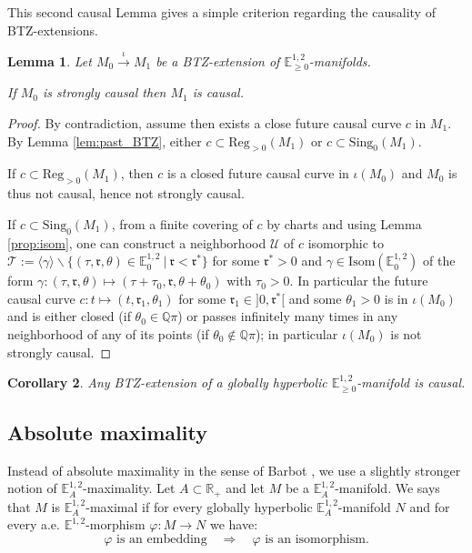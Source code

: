 \documentclass[a4paper,12pt]{article}
\def\r{\mathfrak{r}}
\def\U{\mathcal U}
\def\isom{Isom}
\def\sing{\mathrm{Sing}}
\def\RR{\mathbb{R}}
\newcommand{\mass}[1]{{\mathbb E}^{1,2}_{#1}}
\def\isom{\mathrm{Isom}}
\def\Reg{\mathrm{Reg}}
\def\reg{\Reg}
\newtheorem{lemou}{Lemma}[section]          %
\newtheorem{corou}[lemou]{Corollary}
\begin{document}
This second causal Lemma gives a simple criterion regarding the causality of BTZ-extensions. 
\begin{lemou} Let $M_0\xrightarrow{\iota}M_1$ be a BTZ-extension of $\mass{\geq0}$-manifolds.

If $M_0$ is strongly causal then $M_1$ is causal.
\end{lemou}
\begin{proof}
By contradiction, assume then exists a close future causal curve $c$ in $M_1$. By Lemma \ref{lem:past_BTZ}, either $c\subset \reg_{>0}(M_1)$ or $c\subset \sing_0(M_1)$. 

If $c\subset \reg_{>0}(M_1)$, then $c$ is a closed future causal curve in $\iota(M_0)$ and $M_0$ is thus not causal, hence not strongly causal.

If $c\subset \sing_0(M_1)$, from a finite covering of $c$ by charts and using Lemma \ref{prop:isom}, one can construct a neighborhood  $\U$ of $c$ isomorphic to $\mathcal T:=\langle\gamma\rangle \backslash\{(\tau,\r,\theta)\in \mass{0}~|~ \r<\r^*\}$ for some $\r^*>0$ and $\gamma\in \isom(\mass{0})$ of the form $\gamma: (\tau,\r,\theta)\mapsto (\tau+\tau_0,\r,\theta+\theta_0)$ with $\tau_0>0$. 
In particular the future causal curve $c: t \mapsto (t,\r_1,\theta_1)$ for some $\r_1\in ]0,\r^*[$ and some $\theta_1>0$ is in $\iota(M_0)$ and is either closed (if $\theta_0\in \mathbb Q\pi$) or passes infinitely many times in any neighborhood of any of its points (if $\theta_0\not\in \mathbb Q\pi$); in particular $\iota(M_0)$ is not strongly causal.
\end{proof}
\begin{corou}\label{cor:GH_causal} Any BTZ-extension of a globally hyperbolic $\mass{\geq0}$-manifold is causal.
\end{corou}

\subsection{Absolute maximality}
\label{sec:Abs_max}

Instead of absolute maximality in the sense of Barbot \cite{barbot_globally_2004}, we use a slightly stronger notion of $\mass{A}$-maximality. Let $A\subset \RR_+$ and let $M$ be a $\mass{A}$-manifold. We says that $M$ is $\mass{A}$-maximal  if for every globally hyperbolic $\mass{A}$-manifold $N$ and for every a.e. $\mass{}$-morphism $\varphi:M\rightarrow N$  we have:
 $$ \varphi \text{~is an embedding} \quad \Rightarrow \quad \varphi \text{~is an isomorphism}. $$
 
\end{document}

